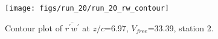 \begin{figure}[H]
\centering
\texttt{[image: figs/run\_20/run\_20\_rw\_contour]}
\caption{Contour plot of $\overline{r^\prime w^\prime}$ at $z/c$=6.97, $V_{free}$=33.39, station 2.}
\label{fig:run_20_rw_contour}
\end{figure}


